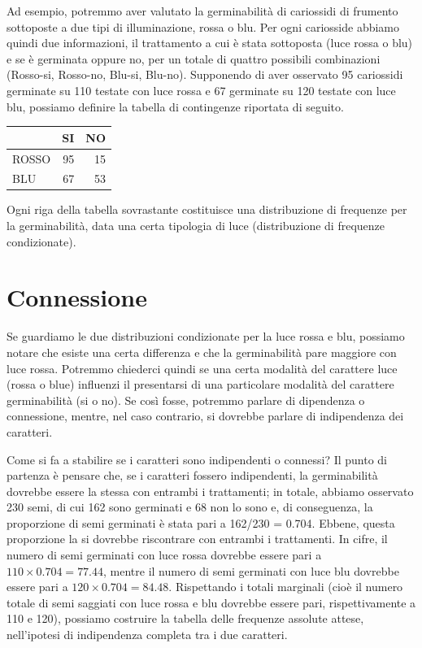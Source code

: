\documentclass[
  12pt,
]{book}
\begin{document}
Ad esempio, potremmo aver valutato la germinabilità di cariossidi di frumento sottoposte a due tipi di illuminazione, rossa o blu. Per ogni cariosside abbiamo quindi due informazioni, il trattamento a cui è stata sottoposta (luce rossa o blu) e se è germinata oppure no, per un totale di quattro possibili combinazioni (Rosso-si, Rosso-no, Blu-si, Blu-no). Supponendo di aver osservato 95 cariossidi germinate su 110 testate con luce rossa e 67 germinate su 120 testate con luce blu, possiamo definire la tabella di contingenze riportata di seguito.

\begin{longtable}[]{@{}lrr@{}}
\toprule()
& SI & NO \\
\midrule()
\endhead
ROSSO & 95 & 15 \\
BLU & 67 & 53 \\
\bottomrule()
\end{longtable}

Ogni riga della tabella sovrastante costituisce una distribuzione di frequenze per la germinabilità, data una certa tipologia di luce (distribuzione di frequenze condizionate).

\hypertarget{connessione}{%
\section{Connessione}\label{connessione}}

Se guardiamo le due distribuzioni condizionate per la luce rossa e blu, possiamo notare che esiste una certa differenza e che la germinabilità pare maggiore con luce rossa. Potremmo chiederci quindi se una certa modalità del carattere luce (rossa o blue) influenzi il presentarsi di una particolare modalità del carattere germinabilità (si o no). Se così fosse, potremmo parlare di dipendenza o connessione, mentre, nel caso contrario, si dovrebbe parlare di indipendenza dei caratteri.

Come si fa a stabilire se i caratteri sono indipendenti o connessi? Il punto di partenza è pensare che, se i caratteri fossero indipendenti, la germinabilità dovrebbe essere la stessa con entrambi i trattamenti; in totale, abbiamo osservato 230 semi, di cui 162 sono germinati e 68 non lo sono e, di conseguenza, la proporzione di semi germinati è stata pari a 162/230 = 0.704. Ebbene, questa proporzione la si dovrebbe riscontrare con entrambi i trattamenti. In cifre, il numero di semi germinati con luce rossa dovrebbe essere pari a \(110 \times 0.704 = 77.44\), mentre il numero di semi germinati con luce blu dovrebbe essere pari a \(120 \times 0.704 = 84.48\). Rispettando i totali marginali (cioè il numero totale di semi saggiati con luce rossa e blu dovrebbe essere pari, rispettivamente a 110 e 120), possiamo costruire la tabella delle frequenze assolute attese, nell'ipotesi di indipendenza completa tra i due caratteri.
\end{document}

